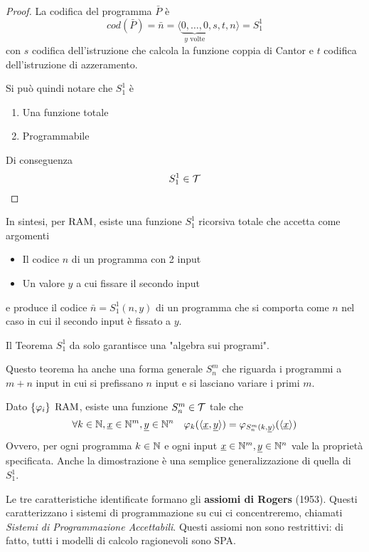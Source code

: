 \begin{proof}
	La codifica del programma $\bar{P}$ è
	$$ cod(\bar{P}) = \bar{n} = \langle \underbrace{0,\dots,0}_{y\text{ volte}},s,t,n \rangle = S^1_1 $$
	con $s$ codifica dell'istruzione che calcola la funzione coppia di Cantor e $t$ codifica dell'istruzione di azzeramento.

	Si può quindi notare che $S_1^1$ è
	\begin{enumerate}
		\item Una funzione totale
		
        \item Programmabile
	\end{enumerate}
	Di conseguenza
	$$ S_1^1 \in \mathcal{T} $$
\end{proof}

In sintesi, per $\text{RAM}$, esiste una funzione $S_1^1$ ricorsiva totale che accetta come argomenti
\begin{itemize}
	\item Il codice $n$ di un programma con 2 input
    
	\item Un valore $y$ a cui fissare il secondo input
\end{itemize}
e produce il codice $\bar{n} = S^1_1 (n,y)$ di un programma che si comporta come $n$ nel caso in cui il secondo input è fissato a $y$. 

Il Teorema $S^1_1$ da solo garantisce una "algebra sui programi".

Questo teorema ha anche una forma generale $S_n^m$ che riguarda i programmi a $m+n$ input in cui si prefissano $n$ input e si lasciano variare i primi $m$.\\

\begin{theor}[$S_n^m$]
	Dato $\{\varphi_i\}$ $\text{RAM}$, esiste una funzione $S_n^m \in \mathcal{T}$ tale che
	$$ \forall k \in \mathbb{N}, \underline{x} \in \mathbb{N}^m, \underline{y} \in \mathbb{N}^n \quad \varphi_k (\langle \underline{x}, \underline{y} \rangle) = \varphi_{S_n^m (k, \underline{y})} (\langle \underline{x} \rangle) $$
	Ovvero, per ogni programma $k \in \mathbb{N}$ e ogni input $\underline{x} \in \mathbb{N}^m, \underline{y} \in \mathbb{N}^n$ vale la proprietà specificata. Anche la dimostrazione è una semplice generalizzazione di quella di $S_1^1$.
\end{theor}

Le tre caratteristiche identificate formano gli \textbf{assiomi di Rogers} (1953). Questi caratterizzano i sistemi di programmazione su cui ci concentreremo, chiamati \textit{Sistemi di Programmazione Accettabili}. Questi assiomi non sono restrittivi: di fatto, tutti i modelli di calcolo ragionevoli sono SPA.

